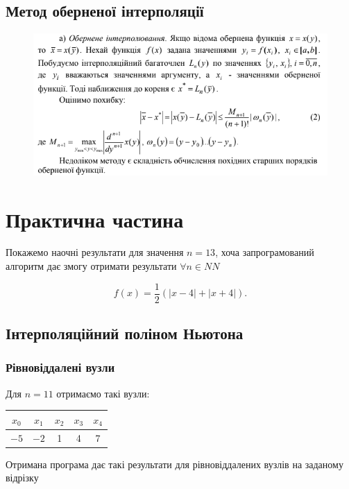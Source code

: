 \subsection{Метод оберненої інтерполяції}

\begin{figure}[H]
	\centering
	\includegraphics[width=\linewidth]{inverse.png}
\end{figure}

\section{Практична частина}

Покажемо наочні результати для значення $n = 13$, хоча запрограмований алгоритм дає змогу отримати результати $\forall n \in NN$

\[ f(x) = \dfrac12(|x-4|+|x+4|).\]

\subsection{Інтерполяційний поліном Ньютона}
	
\subsubsection{Рівновіддалені вузли}

Для $n = 11$ отримаємо такі вузли:
\begin{table}[H]
	\centering
	\begin{tabular}{|c|c|c|c|c|}
	\hline
	$x_0$ & $x_1$ & $x_2$ & $x_3$ & $x_4$ \\ \hline
	$-5$ & $-2$ & 1 & 4 & 7 \\ \hline
	\end{tabular}
\end{table}

Отримана програма дає такі результати для рівновіддалених вузлів на заданому відрізку

